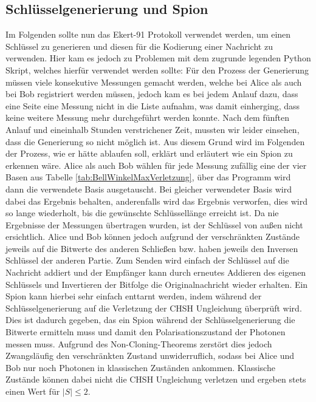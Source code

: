 \documentclass[12pt,a4paper]{article}
\begin{document}
	\subsection{Schlüsselgenerierung und Spion}
	Im Folgenden sollte nun das Ekert-91 Protokoll verwendet werden, um einen Schlüssel zu
	generieren und diesen für die Kodierung einer Nachricht zu verwenden.
	\newline
	Hier kam es jedoch zu Problemen mit dem zugrunde legenden Python Skript, welches hierfür
	verwendet werden sollte:
	Für den Prozess der Generierung müssen viele konsekutive Messungen gemacht werden,
	welche bei Alice als auch bei Bob registriert werden müssen, jedoch kam es bei jedem Anlauf
	dazu, dass eine Seite eine Messung nicht in die Liste aufnahm, was damit einherging,
	dass keine weitere Messung mehr durchgeführt werden konnte.
	Nach dem fünften Anlauf und eineinhalb Stunden verstrichener Zeit,
	mussten wir leider einsehen, dass die Generierung so nicht möglich ist.
	\newline
	Aus diesem Grund wird im Folgenden der Prozess, wie er hätte ablaufen soll, erklärt
	und erläutert wie ein Spion zu erkennen wäre.
	\newline
	\newline
	Alice als auch Bob wählen für jede Messung zufällig eine der vier Basen aus Tabelle
	\ref{tab:BellWinkelMaxVerletzung}, über das Programm wird dann die verwendete Basis ausgetauscht.
	Bei gleicher verwendeter Basis wird dabei das Ergebnis behalten, anderenfalls wird das
	Ergebnis verworfen, dies wird so lange wiederholt, bis die gewünschte Schlüssellänge
	erreicht ist.
	Da nie Ergebnisse der Messungen übertragen wurden, ist der Schlüssel von
	außen nicht ersichtlich. Alice und Bob können jedoch aufgrund
	der verschränkten Zustände jeweils auf die Bitwerte des anderen Schließen bzw. haben jeweils den
	Inversen Schlüssel der anderen Partie.
	Zum Senden wird einfach der Schlüssel auf die Nachricht addiert und der Empfänger kann durch erneutes
	Addieren des eigenen Schlüssels und Invertieren der Bitfolge die Originalnachricht wieder erhalten.
	\newline
	\newline
	Ein Spion kann hierbei sehr einfach enttarnt werden, indem während der Schlüsselgenerierung
	auf die Verletzung der CHSH Ungleichung überprüft wird.
	\newline
	Dies ist dadurch gegeben, das ein Spion während der Schlüsselgenerierung die Bitwerte ermitteln muss
	und damit den Polarisationszustand der Photonen messen muss. Aufgrund des
	Non-Cloning-Theorems zerstört dies jedoch Zwangsläufig den verschränkten Zustand unwiderruflich,
	sodass bei Alice und Bob nur noch Photonen in klassischen Zuständen ankommen.
	Klassische Zustände können dabei nicht die CHSH Ungleichung verletzen und ergeben stets
	einen Wert für \(|S| \leq 2\).
\end{document}
